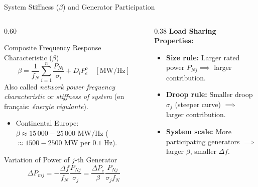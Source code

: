 \begin{frame}{System Stiffness ($\beta$) and Generator Participation}
\begin{columns}[T]
\begin{column}{0.60\textwidth}
    \footnotesize
    \begin{block}{Composite Frequency Response Characteristic ($\beta$)}
    \scriptsize
    \begin{equation*}
        \beta = \frac{1}{f_N} \sum_{i=1}^n \frac{P_{Ni}}{\sigma_i} + D_l P_e^o \quad [\text{MW/Hz}]
    \end{equation*}
    Also called \textit{network power frequency characteristic} or \textit{stiffness of system} (en français: \textit{énergie régulante}).
    \begin{itemize}\setlength{\itemsep}{1pt}
        \item Continental Europe: $\beta \approx 15\,000 - 25\,000\text{ MW/Hz}$ ($\approx 1500 - 2500\text{ MW}$ per $0.1\text{ Hz}$).
    \end{itemize}
    \end{block}
    
    \begin{block}{Variation of Power of $j$-th Generator}
    \scriptsize
    \begin{equation*}
        \Delta P_{mj} = - \frac{\Delta f}{f_N} \frac{P_{Nj}}{\sigma_j} = \boxed{\frac{\Delta P_e}{\beta} \frac{P_{Nj}}{\sigma_j f_N}}
    \end{equation*}
    \end{block}
\end{column}
\begin{column}{0.38\textwidth}
    \scriptsize
    \textbf{Load Sharing Properties:}
    \begin{itemize}\setlength{\itemsep}{2pt}
        \item \textbf{Size rule:} Larger rated power $P_{Nj} \implies$ larger contribution.
        \item \textbf{Droop rule:} Smaller droop $\sigma_j$ (steeper curve) $\implies$ larger contribution.
        \item \textbf{System scale:} More participating generators $\implies$ larger $\beta$, smaller $\Delta f$.
    \end{itemize}
\end{column}
\end{columns}
\end{frame}

